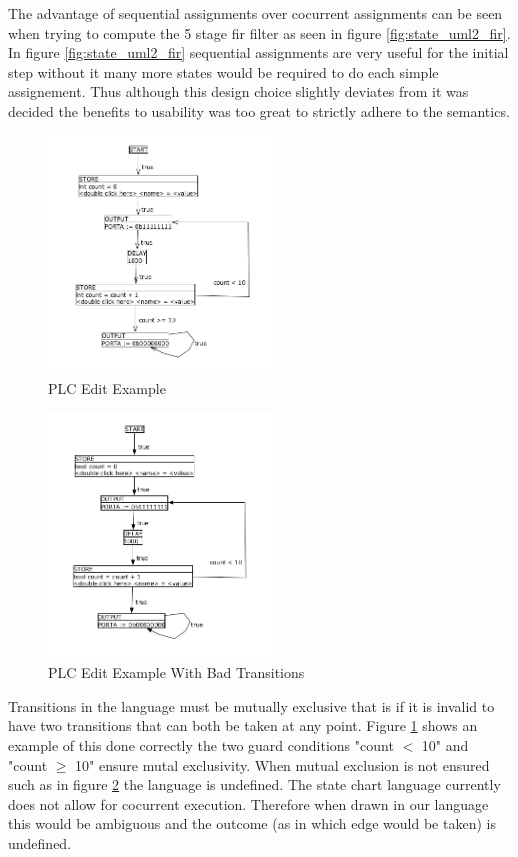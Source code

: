 The advantage of sequential assignments over cocurrent assignments can be seen when trying to compute the 5 stage fir filter as seen in figure \ref{fig:state_uml2_fir}. In figure \ref{fig:state_uml2_fir} sequential assignments are very useful for the initial step without it many more states would be required to do each simple assignement. Thus although this design choice slightly deviates from \cite{UML2} it was decided the benefits to usability was too great to strictly adhere to the \cite{UML2} semantics.

\begin{figure}[htp]
    \centering
    \includegraphics[width=230px]{./images/tool_transition_example.png}
    \caption{PLC Edit Example}
    \label{fig:tool_transition_example}
\end{figure}

\begin{figure}[htp]
    \centering
    \includegraphics[width=230px]{./images/tool_transition_example_bad.png}
    \caption{PLC Edit Example With Bad Transitions}
    \label{fig:tool_transition_example_bad}
\end{figure}

Transitions in the language must be mutually exclusive that is if it is invalid to have two transitions that can both be taken at any point. Figure \ref{fig:tool_transition_example} shows an example of this done correctly the two guard conditions "count $<$ 10" and "count $\geq$ 10" ensure mutal exclusivity. When mutual exclusion is not ensured such as in figure \ref{fig:tool_transition_example_bad} the language is undefined. The state chart language currently does not allow for cocurrent execution. Therefore when drawn in our language this would be ambiguous and the outcome (as in which edge would be taken) is undefined.